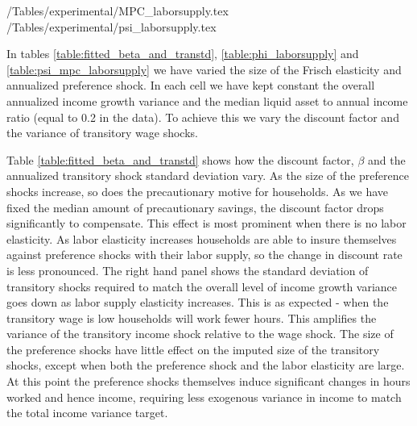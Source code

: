 \documentclass[titlepage]{\econtex}\newcommand{\texname}{IncomeUncertainty}
\begin{document}
\begin{center}
	\econtexRoot/Tables/experimental/MPC_laborsupply.tex
	\econtexRoot/Tables/experimental/psi_laborsupply.tex		
	\label{table:psi_mpc_laborsupply}
\end{center}

In tables \ref{table:fitted_beta_and_transtd}, \ref{table:phi_laborsupply} and \ref{table:psi_mpc_laborsupply} we have varied the size of the Frisch elasticity and annualized preference shock. In each cell we have kept constant the overall annualized income growth variance and the median liquid asset to annual income ratio (equal to 0.2 in the data). To achieve this we vary the discount factor and the variance of transitory wage shocks.

Table \ref{table:fitted_beta_and_transtd} shows how the discount factor, $\beta$ and the annualized transitory shock standard deviation vary. As the size of the preference shocks increase, so does the precautionary motive for households. As we have fixed the median amount of precautionary savings, the discount factor drops significantly to compensate. This effect is most prominent when there is no labor elasticity. As labor elasticity increases households are able to insure themselves against preference shocks with their labor supply, so the change in discount rate is less pronounced. The right hand panel shows the standard deviation of transitory shocks required to match the overall level of income growth variance goes down as labor supply elasticity increases. This is as expected - when the transitory wage is low households will work fewer hours. This amplifies the variance of the transitory income shock relative to the wage shock. The size of the preference shocks have little effect on the imputed size of the transitory shocks, except when both the preference shock and the labor elasticity are large. At this point the preference shocks themselves induce significant changes in hours worked and hence income, requiring less exogenous variance in income to match the total income variance target.
\end{document}
